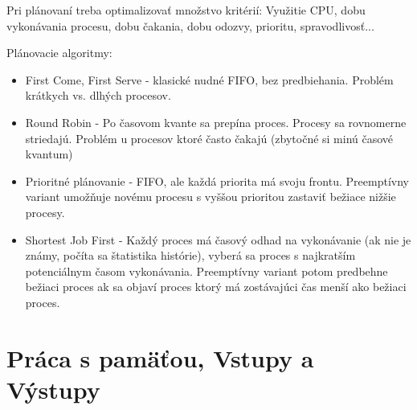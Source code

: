 \documentclass[a4paper,10pt]{article}
\begin{document}
\begin{multicols}{2}
		Pri plánovaní treba optimalizovať množstvo kritérií: Využitie CPU, dobu vykonávania procesu, dobu čakania, dobu odozvy, prioritu, spravodlivosť...
		
		Plánovacie algoritmy:
		
		\begin{itemize}
			\item First Come, First Serve - klasické nudné FIFO, bez predbiehania. Problém krátkych vs. dlhých procesov.
			\item Round Robin - Po časovom kvante sa prepína proces. Procesy sa rovnomerne striedajú. Problém u procesov ktoré často čakajú (zbytočné si minú časové kvantum)
			\item Prioritné plánovanie - FIFO, ale každá priorita má svoju frontu. Preemptívny variant umožňuje novému procesu s vyššou prioritou zastaviť bežiace nižšie procesy.
			\item Shortest Job First - Každý proces má časový odhad na vykonávanie (ak nie je známy, počíta sa štatistika histórie), vyberá sa proces s najkratším potenciálnym časom vykonávania. Preemptívny variant potom predbehne bežiaci proces ak sa objaví proces ktorý má zostávajúci čas menší ako bežiaci proces.
		\end{itemize}		 	
	
\end{multicols}

\section{Práca s pamäťou, Vstupy a Výstupy}
\end{document}
